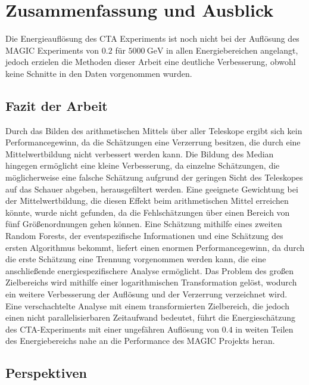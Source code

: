 \chapter{Zusammenfassung und Ausblick}
Die Energieauflösung des CTA Experiments ist noch nicht bei der Auflösung des MAGIC Experiments von $\num{0.2}$ für
$\SI{5000}{\giga\eV}$\cite{MAGIC_performance} in allen Energiebereichen angelangt, jedoch erzielen die Methoden dieser
Arbeit eine deutliche Verbesserung, obwohl keine Schnitte in den Daten vorgenommen wurden.


\section{Fazit der Arbeit}

Durch das Bilden des arithmetischen Mittels über aller Teleskope ergibt sich kein Performancegewinn, da die Schätzungen
eine Verzerrung besitzen, die durch eine Mittelwertbildung nicht verbessert werden kann.
Die Bildung des Median hingegen ermöglicht eine kleine Verbesserung, da einzelne Schätzungen, die möglicherweise
eine falsche Schätzung aufgrund der geringen Sicht des Teleskopes auf das Schauer abgeben, herausgefiltert werden.
Eine geeignete Gewichtung bei der Mittelwertbildung, die diesen Effekt beim arithmetischen Mittel erreichen könnte, wurde
nicht gefunden, da die Fehlschätzungen über einen Bereich von fünf Größenordnungen gehen können.
Eine Schätzung mithilfe eines zweiten Random Forests, der eventspezifische Informationen und eine
Schätzung des ersten Algorithmus bekommt, liefert einen enormen Performancegewinn, da durch die erste Schätzung eine
Trennung vorgenommen werden kann, die eine anschließende energiespezifischere Analyse ermöglicht.
Das Problem des großen Zielbereichs wird mithilfe einer logarithmischen Transformation gelöst, wodurch ein weitere
Verbesserung der Auflösung und der Verzerrung verzeichnet wird.
Eine verschachtelte Analyse mit einem transformierten Zielbereich, die jedoch einen nicht parallelisierbaren Zeitaufwand bedeutet,
führt die Energieschätzung des CTA-Experiments mit einer ungefähren Auflösung von $0.4$ in weiten Teilen des
Energiebereichs nahe an die Performance des MAGIC Projekts heran.

\section{Perspektiven}

